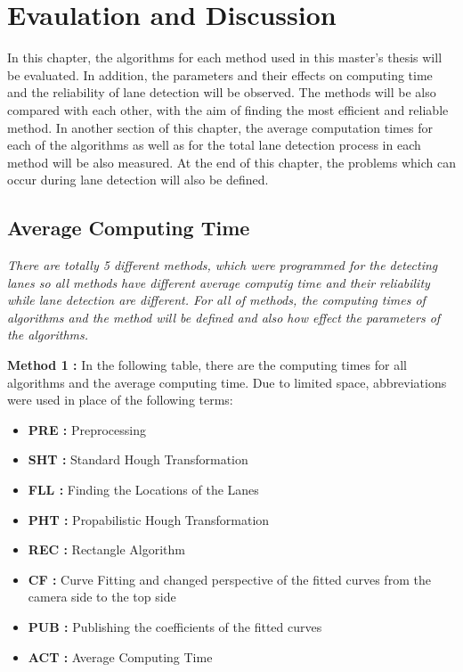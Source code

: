 
%
\chapter{Evaulation and Discussion}
\label{cha:Evaulation and Discussion}

In this chapter, the algorithms for each method used in this master's thesis will be evaluated. In addition, the parameters and their effects on computing time and the reliability of lane detection will be observed. The methods will be also compared with each other, with the aim of finding the most efficient and reliable method. In another section of this chapter, the average computation times for each of the algorithms as well as for the total lane detection process in each method will be also measured. At the end of this chapter, the problems which can occur during lane detection will also be defined.
%

\section{Average Computing Time}\label{sec:Average Computing Time}

\emph{\color{blue}There are totally 5 different methods, which were programmed for the detecting lanes so all methods have different average computig time and their reliability while lane detection are different. For all of methods, the computing times of algorithms and the method will be defined and also how effect  the parameters of the algorithms.}


\textbf{Method 1 : }In the following table, there are the computing times for all algorithms and the average computing time. Due to limited space, abbreviations were used in place of the following terms:


\begin{itemize}[noitemsep]
\item\textbf{PRE : }Preprocessing
\item\textbf{SHT : }Standard Hough Transformation
\item\textbf{FLL : }Finding the Locations of the Lanes
\item\textbf{PHT : }Propabilistic Hough Transformation
\item\textbf{REC : }Rectangle Algorithm
\item\textbf{CF : }Curve Fitting and changed perspective of the fitted curves from the camera side to the top side 
\item\textbf{PUB : }Publishing the coefficients of the fitted curves
\item\textbf{ACT : }Average Computing Time
\end{itemize}

